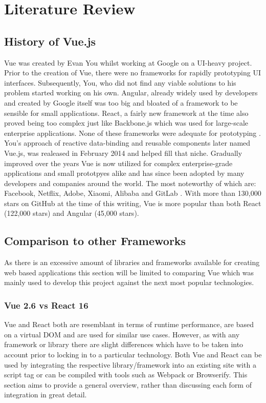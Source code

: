 \chapter[Literature Review]{Literature Review}

\section{History of Vue.js}
Vue was created by Evan You whilst working at Google on a UI-heavy project. Prior to the creation of Vue, there were no frameworks for rapidly prototyping UI interfaces. Subsequently, You, who did not find any viable solutions to his problem started working on his own. Angular, already widely used by developers and created by Google itself was too big and bloated of a framework to be sensible for small applications. React, a fairly new framework at the time also proved being too complex just like Backbone.js which was used for large-scale enterprise applications. None of these frameworks were adequate for prototyping \cite[p.~10]{filipova2016learning}. You's approach of reactive data-binding and reusable components later named Vue.js, was realeased in February 2014 \cite{wiki:Vue} and helped fill that niche. Gradually improved over the years Vue is now utilized for complex enterprise-grade applications and small prototpyes alike and has since been adopted by many developers and companies around the world. The most noteworthy of which are: Facebook, Netflix, Adobe, Xiaomi, Alibaba and GitLab \cite{CompaniesUsingVue:online}. With more than 130,000 stars on GitHub at the time of this writing, Vue is more popular than both React (122,000 stars) and Angular (45,000 stars).


\section{Comparison to other Frameworks}
As there is an excessive amount of libraries and frameworks available for creating web based applications this section will be limited to comparing Vue which was mainly used to develop this project against the next most popular technologies. 

\subsection{Vue 2.6 vs React 16}
Vue and React both are resemblant in terms of runtime performance, are based on a virtual DOM and are used for similar use cases. However, as with any framework or library there are slight differences which have to be taken into account prior to locking in to a particular technology. Both Vue and React can be used by integrating the respective library/framework into an existing site with a script tag or can be compiled with tools such as Webpack or Browserify. This section aims to provide a general overview, rather than discussing each form of integration in great detail.

